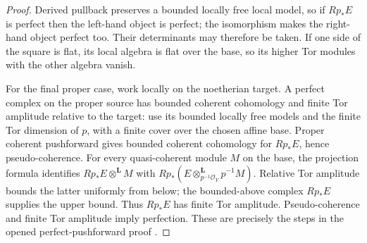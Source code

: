 \begin{proof}
Derived pullback preserves a bounded locally free local model, so
if $Rp_*E$ is perfect then the left-hand object is perfect; the
isomorphism makes the right-hand object perfect too.  Their
determinants may therefore be taken.  If one side of the square
is flat, its local algebra is flat over the base, so its higher
Tor modules with the other algebra vanish.

For the final proper case, work locally on the noetherian target.
A perfect complex on the proper source has bounded coherent
cohomology and finite Tor amplitude relative to the target:
use its bounded locally free models and the finite Tor dimension
of $p$, with a finite cover over the chosen affine base.
Proper coherent pushforward gives bounded coherent cohomology
for $Rp_*E$, hence pseudo-coherence.  For every quasi-coherent
module $M$ on the base, the projection formula identifies
$Rp_*E\otimes^{\mathbf L}M$ with
$Rp_*(E\otimes_{p^{-1}\mathcal O_Y}^{\mathbf L}p^{-1}M)$.
Relative Tor amplitude bounds the latter uniformly from below;
the bounded-above complex $Rp_*E$ supplies the upper bound.
Thus $Rp_*E$ has finite Tor amplitude.  Pseudo-coherence and finite
Tor amplitude imply perfection.  These are precisely the steps
in the opened perfect-pushforward proof
\cite[Tags~0B6G and 08EV]{BStacks}.
\end{proof}

